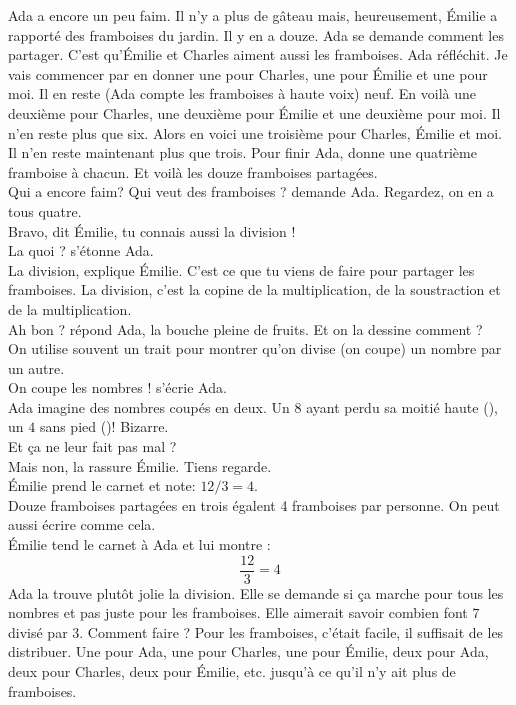 Ada a encore un peu faim.
Il n'y a plus de gâteau mais, heureusement, Émilie a rapporté des framboises du jardin.
Il y en a douze. Ada se demande comment les partager. 
C'est qu'Émilie et Charles aiment aussi les framboises. 
Ada réfléchit. Je vais commencer par en donner une pour Charles, une pour Émilie et une pour moi. 
Il en reste (Ada compte les framboises à haute voix) neuf. 
En voilà une deuxième pour Charles, une deuxième pour Émilie et une deuxième pour moi. Il n'en reste plus que six. 
Alors en voici une troisième pour Charles, Émilie et moi. Il n'en reste maintenant plus que trois. 
Pour finir Ada, donne une quatrième framboise à chacun. Et voilà les douze framboises partagées.\\
\guillemotleft Qui a encore faim? Qui veut des framboises ? demande Ada. Regardez, on en a tous quatre.\\
\mdash Bravo, dit Émilie, tu connais aussi la division !\\
\mdash La quoi ? s'étonne Ada.\\
\mdash La division, explique Émilie. C'est ce que tu viens de faire pour partager les framboises. La division, c'est la copine de la multiplication, de la soustraction et de la multiplication.\\
\mdash Ah bon ? répond Ada, la bouche pleine de fruits. Et on la dessine comment ?\\
\mdash On utilise souvent un trait pour montrer qu'on divise (on coupe) un nombre par un autre.\\ 
\mdash On coupe les nombres ! s'écrie Ada. \guillemotright\\
Ada imagine des nombres coupés en deux. Un $8$ ayant perdu sa moitié haute (), un $4$ sans pied ()! Bizarre.\\
\guillemotleft Et ça ne leur fait pas mal ?\\
\mdash Mais non, la rassure Émilie. Tiens regarde. \guillemotright\\
Émilie prend le carnet et note: $12/3=4$.\\
\guillemotleft Douze framboises partagées en trois égalent 4 framboises par personne. On peut aussi écrire comme cela. \guillemotright\\
Émilie tend le carnet à Ada et lui montre : 
$$\frac{12}{3}=4$$
Ada la trouve plutôt jolie la division. Elle se demande si ça marche pour tous les nombres et pas juste pour les framboises. 
Elle aimerait savoir combien font $7$ divisé par $3$. Comment faire ? Pour les framboises, c'était facile, il suffisait de les distribuer. Une pour Ada, une pour Charles, une pour Émilie, deux pour Ada, deux pour Charles, deux pour Émilie, etc. jusqu'à ce qu'il n'y ait plus de framboises. 
